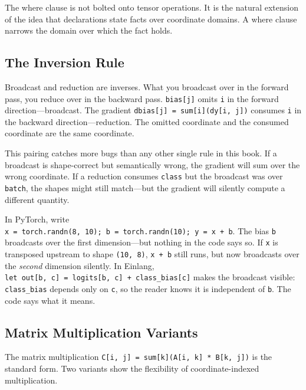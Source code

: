 \documentclass[11pt,titlepage]{article}
\begin{document}
The where clause is not bolted onto tensor operations. It is the natural
extension of the idea that declarations state facts over coordinate
domains. A where clause narrows the domain over which the fact holds.

\vspace{2em}

\hypertarget{the-inversion-rule}{%
\subsection{The Inversion Rule}\label{the-inversion-rule}}

Broadcast and reduction are inverses. What you broadcast over in the
forward pass, you reduce over in the backward pass. \texttt{bias{[}j{]}}
omits \texttt{i} in the forward direction---broadcast. The gradient
\texttt{dbias{[}j{]}\ =\ sum{[}i{]}(dy{[}i,\ j{]})} consumes \texttt{i}
in the backward direction---reduction. The omitted coordinate and the
consumed coordinate are the same coordinate.

This pairing catches more bugs than any other single rule in this book.
If a broadcast is shape-correct but semantically wrong, the gradient
will sum over the wrong coordinate. If a reduction consumes
\texttt{class} but the broadcast was over \texttt{batch}, the shapes
might still match---but the gradient will silently compute a different
quantity.

In PyTorch, write
\texttt{x\ =\ torch.randn(8,\ 10);\ b\ =\ torch.randn(10);\ y\ =\ x\ +\ b}.
The bias \texttt{b} broadcasts over the first dimension---but nothing in
the code says so. If \texttt{x} is transposed upstream to shape
\texttt{(10,\ 8)}, \texttt{x\ +\ b} still runs, but now broadcasts over
the \emph{second} dimension silently. In Einlang,
\texttt{let\ out{[}b,\ c{]}\ =\ logits{[}b,\ c{]}\ +\ class\_bias{[}c{]}}
makes the broadcast visible: \texttt{class\_bias} depends only on
\texttt{c}, so the reader knows it is independent of \texttt{b}. The
code says what it means.

\vspace{2em}

\hypertarget{matrix-multiplication-variants}{%
\subsection{Matrix Multiplication
Variants}\label{matrix-multiplication-variants}}

The matrix multiplication
\texttt{C{[}i,\ j{]}\ =\ sum{[}k{]}(A{[}i,\ k{]}\ *\ B{[}k,\ j{]})} is
the standard form. Two variants show the flexibility of
coordinate-indexed multiplication.
\end{document}
